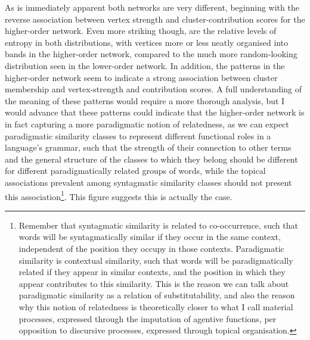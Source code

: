 As is immediately apparent both networks are very different, beginning with the reverse association between vertex strength and cluster-contribution scores for the higher-order network.
Even more striking though, are the relative levels of entropy in both distributions, with vertices more or less neatly organised into bands in the higher-order network, compared to the much more random-looking distribution seen in the lower-order network.
In addition, the patterns in the higher-order network seem to indicate a strong association between cluster membership and vertex-strength and contribution scores.
A full understanding of the meaning of these patterns would require a more thorough analysis, but I would advance that these patterns could indicate that the higher-order network is in fact capturing a more paradigmatic notion of relatedness, as we can expect paradigmatic similarity classes to represent different functional roles in a language's grammar, such that the strength of their connection to other terms and the general structure of the classes to which they belong should be different for different paradigmatically related groups of words, while the topical associations prevalent among syntagmatic similarity classes should not present this association\footnote{
    Remember that syntagmatic similarity is related to co-occurrence, such that words will be syntagmatically similar if they occur in the same context, independent of the position they occupy in those contexts.
    Paradigmatic similarity is contextual similarity, such that words will be paradigmatically related if they appear in similar contexts, and the position in which they appear contributes to this similarity.
    This is the reason we can talk about paradigmatic similarity as a relation of substitutability, and also the reason why this notion of relatedness is theoretically closer to what I call material processes, expressed through the imputation of agentive functions, per opposition to discursive processes, expressed through topical organisation.
}.
This figure suggests this is actually the case.

